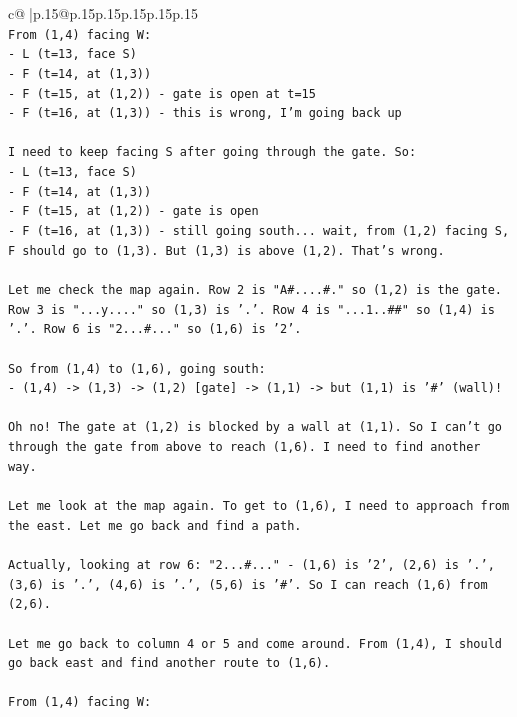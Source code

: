 \documentclass{article}
\begin{document}
{\begin{supertabular}{c@{$\;$}|p{.15\linewidth}@{}p{.15\linewidth}p{.15\linewidth}p{.15\linewidth}p{.15\linewidth}p{.15\linewidth}}
{{{\\ 
\texttt{From (1,4) facing W:} \\
\texttt{{-} L (t=13, face S)} \\
\texttt{{-} F (t=14, at (1,3))} \\
\texttt{{-} F (t=15, at (1,2)) {-} gate is open at t=15} \\
\texttt{{-} F (t=16, at (1,3)) {-} this is wrong, I'm going back up} \\
\\ 
\texttt{I need to keep facing S after going through the gate. So:} \\
\texttt{{-} L (t=13, face S)} \\
\texttt{{-} F (t=14, at (1,3))} \\
\texttt{{-} F (t=15, at (1,2)) {-} gate is open} \\
\texttt{{-} F (t=16, at (1,3)) {-} still going south... wait, from (1,2) facing S, F should go to (1,3). But (1,3) is above (1,2). That's wrong.} \\
\\ 
\texttt{Let me check the map again. Row 2 is "A\#....\#." so (1,2) is the gate. Row 3 is "...y...." so (1,3) is '.'. Row 4 is "...1..\#\#" so (1,4) is '.'. Row 6 is "2...\#..." so (1,6) is '2'.} \\
\\ 
\texttt{So from (1,4) to (1,6), going south:} \\
\texttt{{-} (1,4) {-}> (1,3) {-}> (1,2) {[}gate{]} {-}> (1,1) {-}> but (1,1) is '\#' (wall)!} \\
\\ 
\texttt{Oh no! The gate at (1,2) is blocked by a wall at (1,1). So I can't go through the gate from above to reach (1,6). I need to find another way.} \\
\\ 
\texttt{Let me look at the map again. To get to (1,6), I need to approach from the east. Let me go back and find a path.} \\
\\ 
\texttt{Actually, looking at row 6: "2...\#..." {-} (1,6) is '2', (2,6) is '.', (3,6) is '.', (4,6) is '.', (5,6) is '\#'. So I can reach (1,6) from (2,6).} \\
\\ 
\texttt{Let me go back to column 4 or 5 and come around. From (1,4), I should go back east and find another route to (1,6).} \\
\\ 
\texttt{From (1,4) facing W:} \\
}}}
\end{supertabular}}
\end{document}
